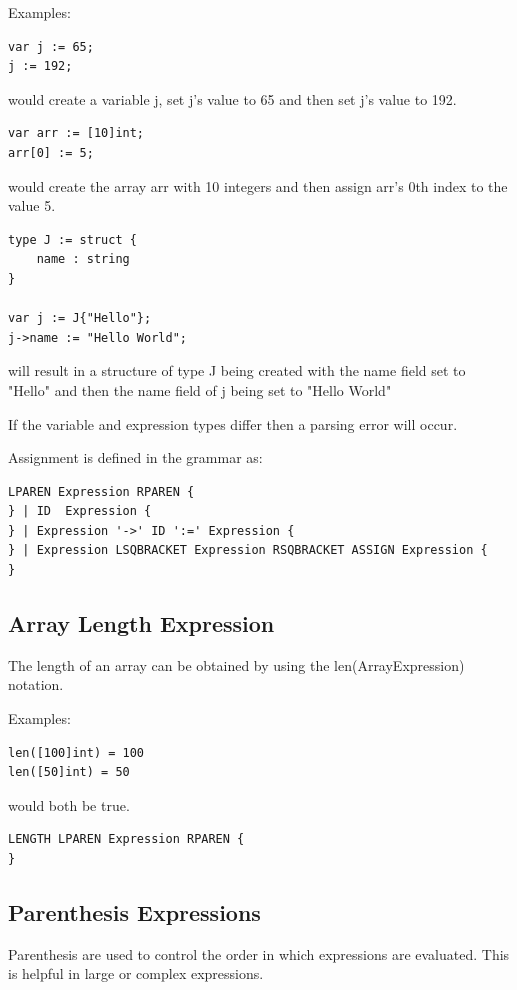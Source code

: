 \documentclass[]{final_report}
\begin{document}
Examples: \begin{verbatim}
var j := 65;
j := 192;
\end{verbatim}

would create a variable j, set j's value to 65 and then set j's value to 192.

\begin{verbatim}
var arr := [10]int;
arr[0] := 5;
\end{verbatim}

would create the array arr with 10 integers and then assign arr's 0th index to the value 5.

\begin{verbatim}
type J := struct {
	name : string
}

var j := J{"Hello"};
j->name := "Hello World";
\end{verbatim}
will result in a structure of type J being created with the name field set to "Hello" and then the name field of j being set to "Hello World"

If the variable and expression types differ then a parsing error will occur.

Assignment is defined in the grammar as:
\begin{verbatim}
LPAREN Expression RPAREN {
} | ID  Expression {
} | Expression '->' ID ':=' Expression {
} | Expression LSQBRACKET Expression RSQBRACKET ASSIGN Expression {
} 
\end{verbatim}

\subsection{Array Length Expression}

The length of an array can be obtained by using the len(ArrayExpression) notation.

Examples:
\begin{verbatim}
len([100]int) = 100
len([50]int) = 50
\end{verbatim}
would both be true.

\begin{verbatim}LENGTH LPAREN Expression RPAREN {
}
\end{verbatim}

\subsection{Parenthesis Expressions}

Parenthesis are used to control the order in which expressions are evaluated. This is helpful in large or complex expressions.
\end{document}
